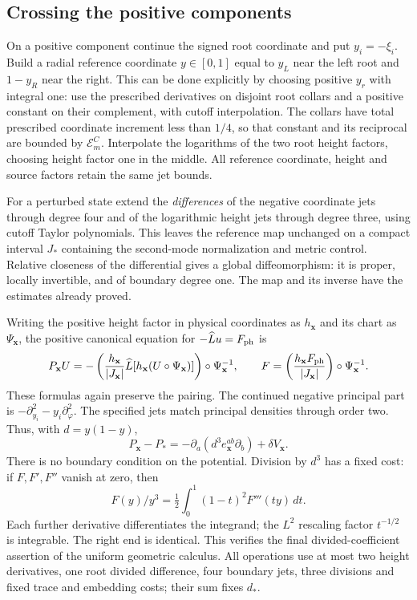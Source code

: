 \subsection{Crossing the positive components}

On a positive component continue the signed root coordinate and put
$y_i=-\xi_i$. Build a radial reference coordinate $y\in[0,1]$
equal to $y_L$ near the left root and $1-y_R$ near the right.
This can be done explicitly by choosing positive $y_r$ with integral
one: use the prescribed derivatives on disjoint root collars and a
positive constant on their complement, with cutoff interpolation.
The collars have total prescribed coordinate increment less than
$1/4$, so that constant and its reciprocal are bounded by
$\mathcal E_m^C$. Interpolate the logarithms of the two root height
factors, choosing height factor one in the middle. All reference
coordinate, height and source factors retain the same jet bounds.

For a perturbed state extend the \emph{differences} of the negative
coordinate jets through degree four and of the logarithmic height
jets through degree three, using cutoff Taylor polynomials. This
leaves the reference map unchanged on a compact interval $J_*$
containing the second-mode normalization and metric control.
Relative closeness of the differential gives a global diffeomorphism:
it is proper, locally invertible, and of boundary degree one.
The map and its inverse have the estimates already proved.

Writing the positive height factor in physical coordinates as
$h_{\mathbf x}$ and its chart as $\Psi_{\mathbf x}$, the positive
canonical equation for $-\widehat Lu=F_{\rm ph}$ is
\begin{equation}\label{eq:pp-fixed-canonical-source}
 P_{\mathbf x}U
 =-\left(\frac{h_{\mathbf x}}{|J_{\mathbf x}|}
       \widehat L[h_{\mathbf x}(U\circ\Psi_{\mathbf x})]\right)
             \circ\Psi_{\mathbf x}^{-1},\qquad
 F=\left(\frac{h_{\mathbf x}F_{\rm ph}}{|J_{\mathbf x}|}\right)
             \circ\Psi_{\mathbf x}^{-1}.
\end{equation}
These formulas again preserve the pairing. The continued negative
principal part is $-\partial_{y_i}^2-y_i\partial_\varphi^2$.
The specified jets match principal densities through order two.
Thus, with $d=y(1-y)$,
\begin{equation}\label{eq:readable-positive-difference}
 P_{\mathbf x}-P_*=-\partial_a(d^3e_{\mathbf x}^{ab}\partial_b)
                           +\delta V_{\mathbf x}.
\end{equation}
There is no boundary condition on the potential. Division by $d^3$
has a fixed cost: if $F,F',F''$ vanish at zero, then
\[
 F(y)/y^3=\tfrac12\int_0^1(1-t)^2F'''(ty)\,dt.
\]
Each further derivative differentiates the integrand; the $L^2$
rescaling factor $t^{-1/2}$ is integrable. The right end is identical.
This verifies the final divided-coefficient assertion of the uniform
geometric calculus. All operations use at most two height derivatives,
one root divided difference, four boundary jets, three divisions and
fixed trace and embedding costs; their sum fixes $d_*$.

